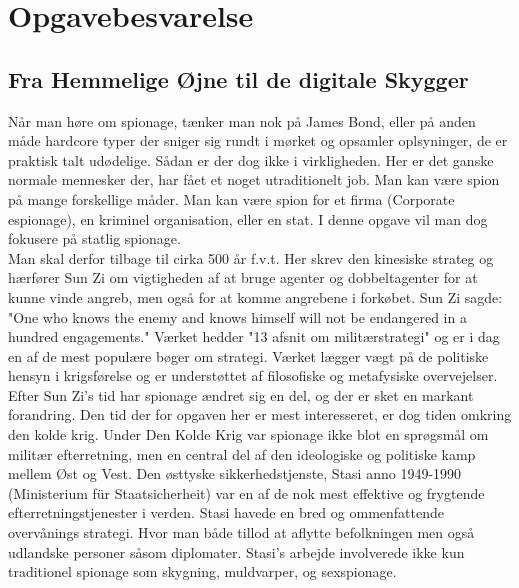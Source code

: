 \newpage
\section{Opgavebesvarelse}\label{sec:OpgaveBesvarelse}

\subsection{Fra Hemmelige Øjne til de digitale Skygger}\label{sec:Redegorsel}
Når man høre om spionage, tænker man nok på James Bond, eller på anden måde hardcore typer der sniger sig rundt i mørket og opsamler oplsyninger, de er praktisk talt udødelige. Sådan er der dog ikke i virkligheden. Her er det ganske normale mennesker der, har fået et noget utraditionelt job. Man kan være spion på mange forskellige måder. Man kan være spion for et firma (Corporate espionage), en kriminel organisation, eller en stat. I denne opgave vil man dog fokusere på statlig spionage. \\
Man skal derfor tilbage til cirka 500 år f.v.t. Her skrev den kinesiske strateg og hærfører Sun Zi om vigtigheden af at bruge agenter og dobbeltagenter for at kunne vinde angreb, men også for at komme angrebene i forkøbet. Sun Zi sagde: "One who knows the enemy and knows himself will not be endangered in a hundred engagements."  %
Værket hedder "13 afsnit om militærstrategi" og er i dag en af de mest populære bøger om strategi. Værket lægger vægt på de politiske hensyn i krigsførelse og er understøttet af filosofiske og metafysiske overvejelser. %
Efter Sun Zi's tid har spionage ændret sig en del, og der er sket en markant forandring. Den tid der for opgaven her er mest interesseret, er dog tiden omkring den kolde krig. Under Den Kolde Krig var spionage ikke blot en sprøgsmål om militær efterretning, men en central del af den ideologiske og politiske kamp mellem Øst og Vest. Den østtyske sikkerhedstjenste, Stasi  anno 1949-1990 (Ministerium für Staatsicherheit) var en af de nok mest effektive og frygtende efterretningstjenester i verden. Stasi havede en bred og ommenfattende overvånings strategi. Hvor man både tillod at aflytte befolkningen men også udlandske personer såsom diplomater. Stasi's arbejde involverede ikke kun traditionel spionage som skygning, muldvarper, og sexspionage.%
